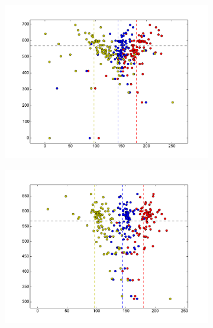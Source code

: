 \documentclass[twoside,english]{uiofysmaster}
\begin{document}
\begin{figure}[hbt]
	\centering
	\begin{subfigure}[b]{0.45\textwidth}
		\includegraphics[width=\textwidth]{figures/herwig_scipy_slsqp_minimization_1p05_initial_guess.pdf} 
		\caption{}
		\label{fig:scipy_fit_nosmear1}
	\end{subfigure}
	\begin{subfigure}[b]{0.45\textwidth}
		\includegraphics[width=\textwidth]{figures/herwig_scipy_tnc_minimization_1p05_initial_guess.pdf} 
		\caption{}
		\label{fig:scipy_fit_nosmear2}
	\end{subfigure}


\end{figure}
\end{document}
